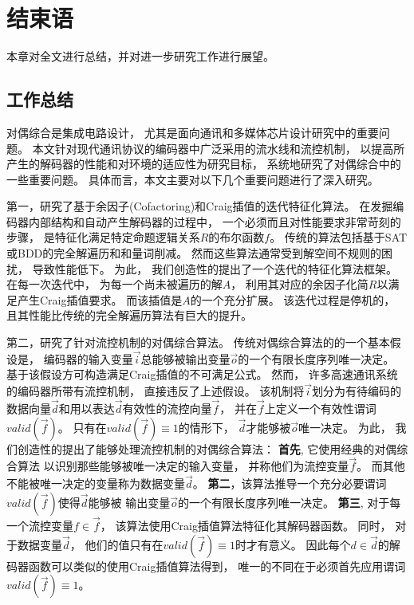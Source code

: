 \chapter{结束语}
\label{chap:7}
本章对全文进行总结，并对进一步研究工作进行展望。
\section{工作总结}
对偶综合是集成电路设计，
尤其是面向通讯和多媒体芯片设计研究中的重要问题。
本文针对现代通讯协议的编码器中广泛采用的流水线和流控机制，
以提高所产生的解码器的性能和对环境的适应性为研究目标，
系统地研究了对偶综合中的一些重要问题。
具体而言，本文主要对以下几个重要问题进行了深入研究。

第一，研究了基于余因子(Cofactoring)和Craig插值的迭代特征化算法。
在发掘编码器内部结构和自动产生解码器的过程中，
一个必须而且对性能要求非常苛刻的步骤，
是特征化满足特定命题逻辑关系$R$的布尔函数$f$。
传统的算法包括基于SAT或BDD的完全解遍历和和量词削减。
然而这些算法通常受到解空间不规则的困扰，
导致性能低下。
为此，
我们创造性的提出了一个迭代的特征化算法框架。
在每一次迭代中，
为每一个尚未被遍历的解$A$，
利用其对应的余因子化简$R$以满足产生Craig插值要求。
而该插值是$A$的一个充分扩展。
该迭代过程是停机的，
且其性能比传统的完全解遍历算法有巨大的提升。

第二，研究了针对流控机制的对偶综合算法。
传统对偶综合算法的的一个基本假设是，
编码器的输入变量$\vec{i}$总能够被输出变量$\vec{o}$的一个有限长度序列唯一决定。
基于该假设方可构造满足Craig插值的不可满足公式。
然而，
许多高速通讯系统的编码器所带有流控机制，
直接违反了上述假设。
该机制将$\vec{i}$划分为有待编码的数据向量$\vec{d}$和用以表达$\vec{d}$有效性的流控向量$\vec{f}$，
并在$\vec{f}$上定义一个有效性谓词$valid(\vec{f})$。
只有在$valid(\vec{f})\equiv 1$的情形下，
$\vec{d}$才能够被$\vec{o}$唯一决定。
为此，
我们创造性的提出了能够处理流控机制的对偶综合算法：
\textbf{首先},
它使用经典的对偶综合算法
以识别那些能够被唯一决定的输入变量，
并称他们为流控变量$\vec{f}$。
而其他不能被唯一决定的变量称为数据变量$\vec{d}$。
\textbf{第二}，该算法推导一个充分必要谓词$valid(\vec{f})$使得$\vec{d}$能够被
输出变量$\vec{o}$的一个有限长度序列唯一决定。
\textbf{第三},
对于每一个流控变量$f\in\vec{f}$，
该算法使用Craig插值算法特征化其解码器函数。
同时，
对于数据变量$\vec{d}$，
他们的值只有在$valid(\vec{f}) \equiv 1$时才有意义。
因此每个$d\in\vec{d}$的解码器函数可以类似的使用Craig插值算法得到，
唯一的不同在于必须首先应用谓词$valid(\vec{f}) \equiv 1$。




